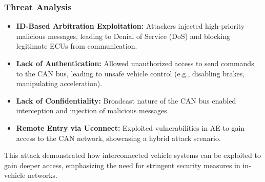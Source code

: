 \documentclass{report}
\begin{document}
\subsubsection{Threat Analysis}
\begin{itemize}
    \item \textbf{ID-Based Arbitration Exploitation:} Attackers injected high-priority malicious messages, leading to Denial of Service (DoS) and blocking legitimate ECUs from communication.
    \item \textbf{Lack of Authentication:} Allowed unauthorized access to send commands to the CAN bus, leading to unsafe vehicle control (e.g., disabling brakes, manipulating acceleration).
    \item \textbf{Lack of Confidentiality:} Broadcast nature of the CAN bus enabled interception and injection of malicious messages.
    \item \textbf{Remote Entry via Uconnect:} Exploited vulnerabilities in AE to gain access to the CAN network, showcasing a hybrid attack scenario.
\end{itemize}
This attack demonstrated how interconnected vehicle systems can be exploited to gain deeper access, emphasizing the need for stringent security measures in in-vehicle networks.
\end{document}
